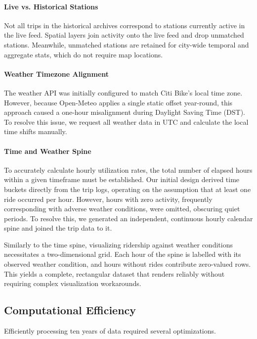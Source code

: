 \paragraph{Live vs. Historical Stations}
Not all trips in the historical archives correspond to stations currently active in the live feed.
Spatial layers join activity onto the live feed and drop unmatched stations.
Meanwhile, unmatched stations are retained for city-wide temporal and aggregate stats, which do not require map locations.

\paragraph{Weather Timezone Alignment}
The weather API was initially configured to match Citi Bike's local time zone.
However, because Open-Meteo applies a single static offset year-round, this approach caused a one-hour misalignment during Daylight Saving Time (DST).
To resolve this issue, we request all weather data in UTC and calculate the local time shifts manually.

\paragraph{Time and Weather Spine}
To accurately calculate hourly utilization rates, the total number of elapsed hours within a given timeframe must be established.
Our initial design derived time buckets directly from the trip logs, operating on the assumption that at least one ride occurred per hour.
However, hours with zero activity, frequently corresponding with adverse weather conditions, were omitted, obscuring quiet periods.
To resolve this, we generated an independent, continuous hourly calendar spine and joined the trip data to it.

Similarly to the time spine, visualizing ridership against weather conditions necessitates a two-dimensional grid.
Each hour of the spine is labelled with its observed weather condition, and hours without rides contribute zero-valued rows.
This yields a complete, rectangular dataset that renders reliably without requiring complex visualization workarounds.

\subsection{Computational Efficiency}
Efficiently processing ten years of data required several optimizations.

